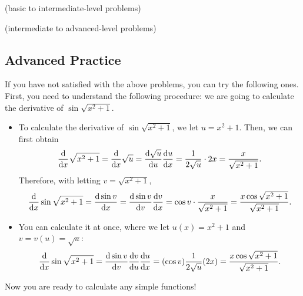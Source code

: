 \documentclass[11pt,pdfa,lastpage]{MishoNote}
\begin{document}
\begin{enumerate}[resume]
  \itemA \textsf{(basic to intermediate-level problems)}
\begin{menumerate}{4}
\end{menumerate}
\itemB \textsf{(intermediate to advanced-level problems)}
\begin{menumerate}{3}


\end{menumerate}
\end{enumerate}

\newpage

\subsection{Advanced Practice}

If you have not satisfied with the above problems, you can try the following ones.
First, you need to understand the following procedure: we are going to calculate the derivative of $\sin\sqrt{x^2+1}$.
\begin{itemize}
  \item To calculate the derivative of $\sin\sqrt{x^2+1}$, we let $u=x^2+1$. Then, we can first obtain
  \[
    \diff{}{x}\sqrt{x^2+1}=\diff{}{x}\sqrt u=\diff{\sqrt u}{u}\diff ux=\frac{1}{2\sqrt u}\cdot2x=\frac{x}{\sqrt{x^2+1}}.
  \]
  Therefore, with letting $v=\sqrt{x^2+1}$,
  \[
  \diff{}{x}\sin\sqrt{x^2+1}=\diff{\sin v}{x}=\diff{\sin v}{v}\diff vx=\cos v\cdot\frac{x}{\sqrt{x^2+1}}=\frac{x\cos\sqrt{x^2+1}}{\sqrt{x^2+1}}.
  \]
  \item You can calculate it at once, where we let $u(x)=x^2+1$ and $v=v(u)=\sqrt{u}$:
  \[
   \diff{}{x}\sin\sqrt{x^2+1}=\diff{\sin v}{v}\diff{v}{u}\diff{u}{x}=(\cos v)\frac{1}{2\sqrt{u}}(2x)=\frac{x\cos\sqrt{x^2+1}}{\sqrt{x^2+1}}.
   \]
\end{itemize}
Now you are ready to calculate any simple functions!
\end{document}
